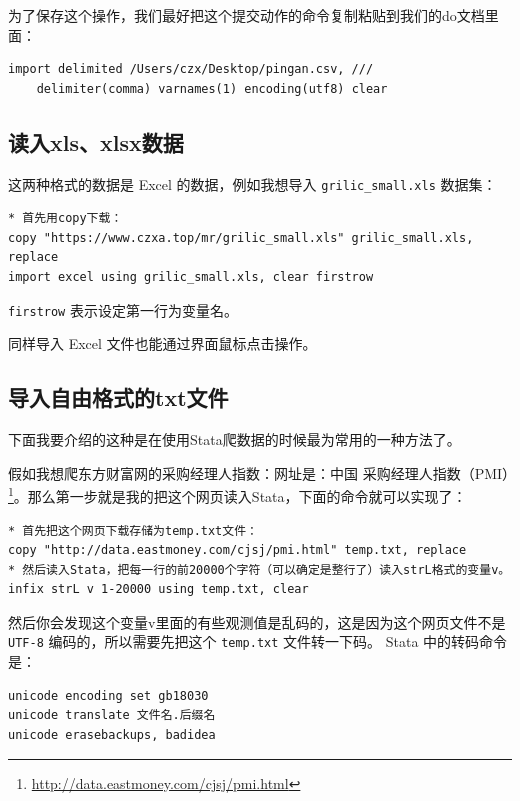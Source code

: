 \documentclass[]{ctexbook}
\renewcommand{\href}[2]{#2\footnote{\url{#1}}}
\begin{document}
为了保存这个操作，我们最好把这个提交动作的命令复制粘贴到我们的do文档里面：

\begin{lstlisting}
import delimited /Users/czx/Desktop/pingan.csv, ///
    delimiter(comma) varnames(1) encoding(utf8) clear
\end{lstlisting}

\hypertarget{xlsxlsx}{%
\subsection{读入xls、xlsx数据}\label{xlsxlsx}}

这两种格式的数据是 Excel 的数据，例如我想导入 \texttt{grilic\_small.xls} 数据集：

\begin{lstlisting}
* 首先用copy下载：
copy "https://www.czxa.top/mr/grilic_small.xls" grilic_small.xls, replace
import excel using grilic_small.xls, clear firstrow
\end{lstlisting}

\texttt{firstrow} 表示设定第一行为变量名。

同样导入 Excel 文件也能通过界面鼠标点击操作。

\hypertarget{txt}{%
\subsection{导入自由格式的txt文件}\label{txt}}

下面我要介绍的这种是在使用Stata爬数据的时候最为常用的一种方法了。

假如我想爬东方财富网的采购经理人指数：网址是：\href{http://data.eastmoney.com/cjsj/pmi.html}{中国 采购经理人指数（PMI）}。那么第一步就是我的把这个网页读入Stata，下面的命令就可以实现了：

\begin{lstlisting}
* 首先把这个网页下载存储为temp.txt文件：
copy "http://data.eastmoney.com/cjsj/pmi.html" temp.txt, replace
* 然后读入Stata，把每一行的前20000个字符（可以确定是整行了）读入strL格式的变量v。
infix strL v 1-20000 using temp.txt, clear
\end{lstlisting}

然后你会发现这个变量v里面的有些观测值是乱码的，这是因为这个网页文件不是 \texttt{UTF-8} 编码的，所以需要先把这个 \texttt{temp.txt} 文件转一下码。 Stata 中的转码命令是：

\begin{lstlisting}
unicode encoding set gb18030
unicode translate 文件名.后缀名
unicode erasebackups, badidea
\end{lstlisting}
\end{document}
